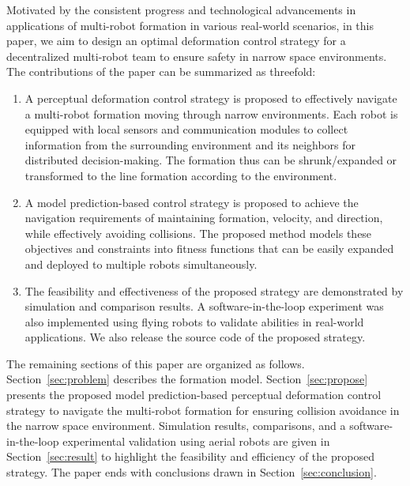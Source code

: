 Motivated by the consistent progress and technological advancements in applications of multi-robot formation in various real-world scenarios, in this paper, we aim to design an optimal deformation control strategy for a decentralized multi-robot team to ensure safety in narrow space environments. The contributions of the paper can be summarized as threefold:
\begin{enumerate}
    \item A perceptual deformation control strategy is proposed to effectively navigate a multi-robot formation moving through narrow environments. Each robot is equipped with local sensors and communication modules to collect information from the surrounding environment and its neighbors for distributed decision-making. The formation thus can be shrunk/expanded or transformed to the line formation according to the environment.
        \item A model prediction-based control strategy is proposed to achieve the navigation requirements of maintaining formation, velocity, and direction, while effectively avoiding collisions. The proposed method models these objectives and constraints into fitness functions that can be easily expanded and deployed to multiple robots simultaneously.
    \item The feasibility and effectiveness of the proposed strategy are demonstrated by simulation and comparison results. A software-in-the-loop experiment was also implemented using flying robots to validate abilities in real-world applications. We also release the source code of the proposed strategy.
\end{enumerate}

The remaining sections of this paper are organized as follows. Section~\ref{sec:problem} describes the formation model. Section~\ref{sec:propose} presents the proposed model prediction-based perceptual deformation control strategy to navigate the multi-robot formation for ensuring collision avoidance in the narrow space environment. Simulation results, comparisons, and a software-in-the-loop experimental validation using aerial robots are given in Section~\ref{sec:result} to highlight the feasibility and efficiency of the proposed strategy. The paper ends with conclusions drawn in Section~\ref{sec:conclusion}.
